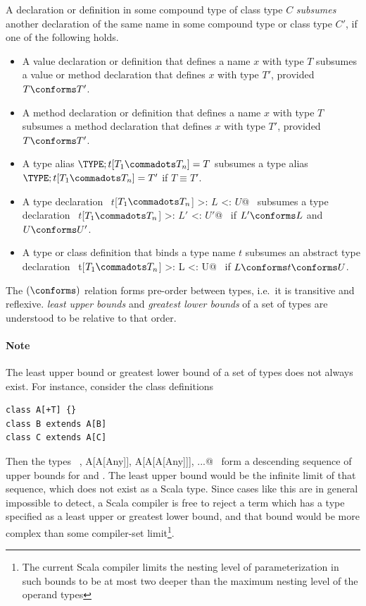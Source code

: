 A declaration or definition in some compound type of class type $C$
{\em subsumes} another
declaration of the same name in some compound type or class type $C'$, if one of the following holds.
\begin{itemize}
\item
A value declaration or definition that defines a name $x$ with type $T$ subsumes 
a value or method declaration that defines $x$ with type $T'$, provided $T \conforms T'$.
\item 
A method declaration or definition that defines a name $x$ with type $T$ subsumes 
a method declaration that defines $x$ with type $T'$, provided $T \conforms T'$.
\item
A type alias
$\TYPE;t[T_1 \commadots T_n]=T$ subsumes a type alias $\TYPE;t[T_1 \commadots T_n]=T'$ if %
$T \equiv T'$. 
\item 
A type declaration ~\lstinline@type $t$[$T_1 \commadots T_n$] >: $L$ <: $U$@~ subsumes %
a type declaration ~\lstinline@type $t$[$T_1 \commadots T_n$] >: $L'$ <: $U'$@~ if $L' \conforms L$ and %
$U \conforms U'$.
\item
A type or class definition that binds a type name $t$ subsumes an abstract
type declaration ~\lstinline@type t[$T_1 \commadots T_n$] >: L <: U@~ if %
$L \conforms t \conforms U$.
\end{itemize}

The $(\conforms)$ relation forms pre-order between types,
i.e.\ it is transitive and reflexive. {\em
least upper bounds} and {\em greatest lower bounds} of a set of types
are understood to be relative to that order.

\paragraph{Note} The least upper bound or greatest lower bound 
of a set of types does not always exist. For instance, consider
the class definitions
\begin{lstlisting}
class A[+T] {}
class B extends A[B] 
class C extends A[C] 
\end{lstlisting}
Then the types ~\lstinline@A[Any], A[A[Any]], A[A[A[Any]]], ...@~ form
a descending sequence of upper bounds for  and . The
least upper bound would be the infinite limit of that sequence, which
does not exist as a Scala type. Since cases like this are in general
impossible to detect, a Scala compiler is free to reject a term
which has a type specified as a least upper or greatest lower bound,
and that bound would be more complex than some compiler-set
limit\footnote{The current Scala compiler limits the nesting level
of parameterization in such bounds to be at most two deeper than the maximum
nesting level of the operand types}.

